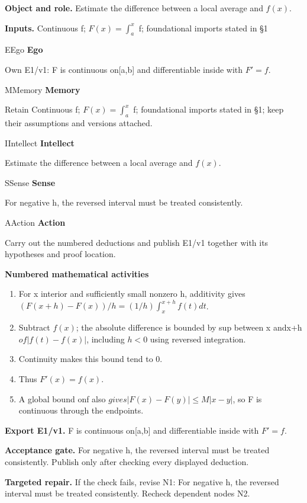 \documentclass[preprint,12pt,aps,pra,showkeys,amsmath,amssymb,superscriptaddress,floatfix]{revtex4-2}
\theoremstyle{definition}
\theoremstyle{remark}
\newcommand{\mmfaculty}[3]{%
 \begin{mmfacultybox}{#1}{#2}
 {\sffamily\bfseries\color{MMBlue}#2}\par\smallskip #3
 \end{mmfacultybox}}
\newcommand{\field}[2]{\par\smallskip\noindent\textbf{#1.} #2\par}
\begin{document}
\field{Object and role}{Estimate the difference between a local average and \(f(x)\).}

\field{Inputs}{Continuous f; \(F(x)=\int _a^x\) f; foundational imports stated in §1}

\mmfaculty{E}{Ego}{Own E1/v1: F is continuous on{[}a,b{]} and differentiable inside with
\(F'=f\).}

\mmfaculty{M}{Memory}{Retain Continuous f; \(F(x)=\int _a^x\) f; foundational imports stated
in §1; keep their assumptions and versions attached.}

\mmfaculty{I}{Intellect}{Estimate the difference between a local average and \(f(x)\).}

\mmfaculty{S}{Sense}{For negative h, the reversed interval must be treated consistently.}

\mmfaculty{A}{Action}{Carry out the numbered deductions and publish E1/v1 together with its
hypotheses and proof location.}

\smallskip\noindent\textbf{Numbered mathematical activities}

\begin{enumerate}[label=N1.\arabic*,leftmargin=3.4em]

\item For x interior and sufficiently small nonzero h, additivity gives
\((F(x+h)-F(x))/h=(1/h)\int _x^{x+h}f(t)dt\).

\item Subtract \(f(x)\); the absolute difference is bounded by sup between x
andx+h \(of|f(t)-f(x)|\), including \(h<0\) using reversed integration.

\item Continuity makes this bound tend to 0.

\item Thus \(F'(x)=f(x)\).

\item A global bound on\textbar f\textbar{} also
\(gives|F(x)-F(y)|\le M|x-y|\), so F is continuous through the
endpoints.

\end{enumerate}

\field{Export E1/v1}{F is continuous on{[}a,b{]} and differentiable inside with \(F'=f\).}

\field{Acceptance gate}{For negative h, the reversed interval must be treated consistently.
Publish only after checking every displayed deduction.}

\field{Targeted repair}{If the check fails, revise N1: For negative h, the reversed interval
must be treated consistently. Recheck dependent nodes N2.}
\end{document}
